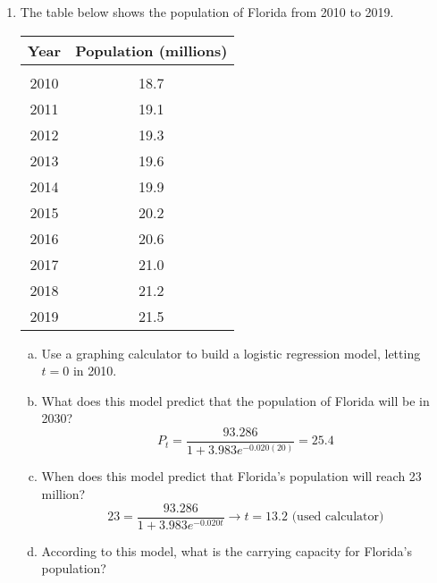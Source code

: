 \begin{enumerate}
\item The table below shows the population of Florida from 2010 to 2019.
\begin{center}
\begin{tabular}{c c}
\textbf{Year} & \textbf{Population (millions)}\\
\hline
 & \\
2010 & 18.7\\
2011 & 19.1\\
2012 & 19.3\\
2013 & 19.6\\
2014 & 19.9\\
2015 & 20.2\\
2016 & 20.6\\
2017 & 21.0\\
2018 & 21.2\\
2019 & 21.5
\end{tabular}
\end{center}
\begin{enumerate}[(a)]
\item Use a graphing calculator to build a logistic regression model, letting $t=0$ in 2010. 
\item What does this model predict that the population of Florida will be in 2030? 
\[P_t = \dfrac{93.286}{1+3.983e^{-0.020(20)}} = 25.4\]
\item When does this model predict that Florida's population will reach 23 million? 
\[23 = \dfrac{93.286}{1+3.983e^{-0.020t}} \longrightarrow t = 13.2 \textrm{ (used calculator)}\]
\item According to this model, what is the carrying capacity for Florida's population? 
\end{enumerate}
\end{enumerate}